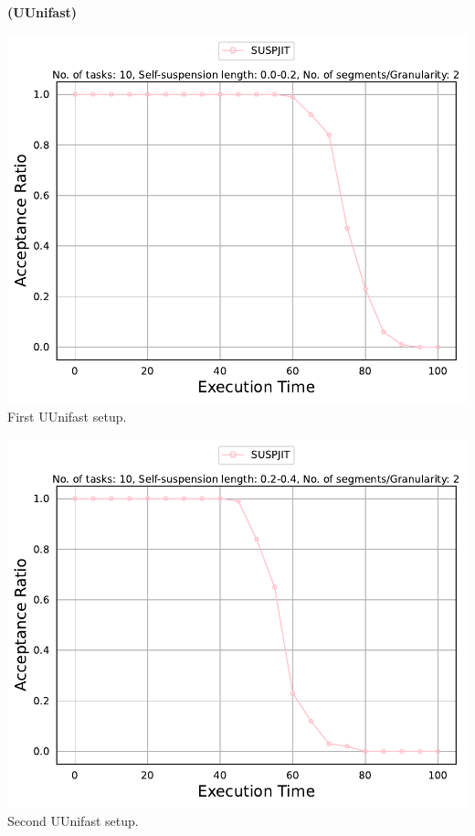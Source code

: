 \documentclass[]{article}
\begin{document}
	
	\begin{minipage}[t]{0.48\linewidth}
		\centering
		\textbf{(UUnifast)}
		\vspace{0.3cm}
		
		\includegraphics[width=\linewidth]{SUSPJIT[2][0.0-0.2][10].pdf}
		First UUnifast setup.
		\vspace{0.3cm}
		
		\includegraphics[width=\linewidth]{SUSPJIT[2][0.2-0.4][10].pdf}
		Second UUnifast setup.
		\vspace{0.3cm}
		

\end{minipage}
\end{document}

